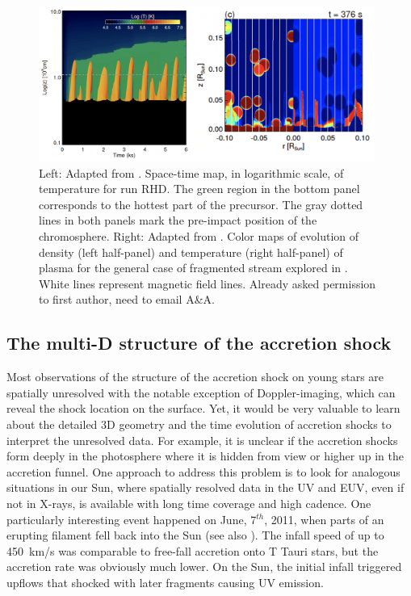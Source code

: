 \begin{figure}[t]
    \centering
    \includegraphics[width=11cm]{figs/colombo.png}
    \caption{Left: Adapted from \cite{Colombo_2019b}. Space-time map, in 
    logarithmic scale, of temperature for run RHD. The green region in the
bottom panel corresponds to the hottest part of the precursor. The gray
dotted lines in both panels mark the pre-impact position of the chromosphere. Right: Adapted from \cite{Colombo_2016}. Color maps of evolution of density (left half-panel) and temperature (right half-panel) of plasma for the general case of fragmented stream explored in \cite{Colombo_2016}. White lines represent magnetic field lines. Already asked permission to first author, need to email A\&A.}
    \label{fig:colombo}
\end{figure}


\subsection{The multi-D structure of the accretion shock}
Most observations of the structure of the accretion shock on young stars are spatially unresolved with the notable exception of Doppler-imaging, which can reveal the shock location on the surface. Yet, it would be very valuable to learn about the detailed 3D geometry and the time evolution of accretion shocks to interpret the unresolved data. For example, it is unclear if the accretion shocks form deeply in the photosphere where it is hidden from view or higher up in the accretion funnel. 
One approach to address this problem is to look for analogous situations in our Sun, where spatially resolved data in the UV and EUV, even if not in X-rays, is available with long time coverage and high cadence. One particularly interesting event happened on June, 7$^{th}$, 2011, when parts of an erupting filament fell back into the Sun \cite{2013Sci...341..251R} (see also \cite{Reale_2014}). The infall speed of up to 450~km/s was comparable to free-fall accretion onto T Tauri stars, but the accretion rate was obviously much lower. On the Sun, the initial infall triggered upflows that shocked with later fragments causing UV emission.




